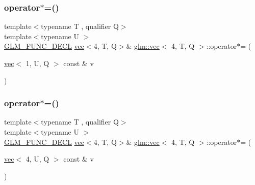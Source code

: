 \mbox{\label{structglm_1_1vec_3_014_00_01_t_00_01_q_01_4_a4b89052935e5383d7b04478b91a25823}} 
\subsubsection{\texorpdfstring{operator$\ast$=()}{operator*=()}\hspace{0.1cm}{\footnotesize\ttfamily [2/6]}}
{\footnotesize\ttfamily template$<$typename T , qualifier Q$>$ \\
template$<$typename U $>$ \\
\hyperlink{setup_8hpp_ab2d052de21a70539923e9bcbf6e83a51}{G\+L\+M\+\_\+\+F\+U\+N\+C\+\_\+\+D\+E\+CL} \hyperlink{structglm_1_1vec}{vec}$<$4, T, Q$>$\& \hyperlink{structglm_1_1vec}{glm\+::vec}$<$ 4, T, Q $>$\+::operator$\ast$= (\begin{DoxyParamCaption}\item[{\hyperlink{structglm_1_1vec}{vec}$<$ 1, U, Q $>$ const \&}]{v }\end{DoxyParamCaption})}

\mbox{\label{structglm_1_1vec_3_014_00_01_t_00_01_q_01_4_a27ac62ee4c5d423e772c40d015ee54da}} 
\subsubsection{\texorpdfstring{operator$\ast$=()}{operator*=()}\hspace{0.1cm}{\footnotesize\ttfamily [3/6]}}
{\footnotesize\ttfamily template$<$typename T , qualifier Q$>$ \\
template$<$typename U $>$ \\
\hyperlink{setup_8hpp_ab2d052de21a70539923e9bcbf6e83a51}{G\+L\+M\+\_\+\+F\+U\+N\+C\+\_\+\+D\+E\+CL} \hyperlink{structglm_1_1vec}{vec}$<$4, T, Q$>$\& \hyperlink{structglm_1_1vec}{glm\+::vec}$<$ 4, T, Q $>$\+::operator$\ast$= (\begin{DoxyParamCaption}\item[{\hyperlink{structglm_1_1vec}{vec}$<$ 4, U, Q $>$ const \&}]{v }\end{DoxyParamCaption})}

